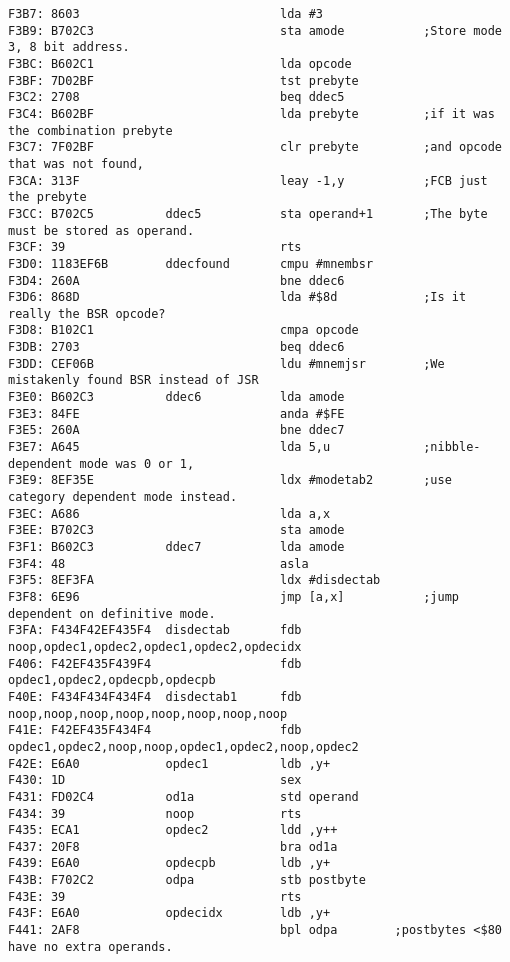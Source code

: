 {\begin{verbatim}
F3B7: 8603                            lda #3
F3B9: B702C3                          sta amode           ;Store mode 3, 8 bit address.
F3BC: B602C1                          lda opcode
F3BF: 7D02BF                          tst prebyte
F3C2: 2708                            beq ddec5
F3C4: B602BF                          lda prebyte         ;if it was the combination prebyte
F3C7: 7F02BF                          clr prebyte         ;and opcode that was not found,
F3CA: 313F                            leay -1,y           ;FCB just the prebyte
F3CC: B702C5          ddec5           sta operand+1       ;The byte must be stored as operand.        
F3CF: 39                              rts
F3D0: 1183EF6B        ddecfound       cmpu #mnembsr
F3D4: 260A                            bne ddec6
F3D6: 868D                            lda #$8d            ;Is it really the BSR opcode?
F3D8: B102C1                          cmpa opcode
F3DB: 2703                            beq ddec6
F3DD: CEF06B                          ldu #mnemjsr        ;We mistakenly found BSR instead of JSR
F3E0: B602C3          ddec6           lda amode
F3E3: 84FE                            anda #$FE
F3E5: 260A                            bne ddec7
F3E7: A645                            lda 5,u             ;nibble-dependent mode was 0 or 1,
F3E9: 8EF35E                          ldx #modetab2       ;use category dependent mode instead.
F3EC: A686                            lda a,x
F3EE: B702C3                          sta amode
F3F1: B602C3          ddec7           lda amode
F3F4: 48                              asla
F3F5: 8EF3FA                          ldx #disdectab
F3F8: 6E96                            jmp [a,x]           ;jump dependent on definitive mode.
F3FA: F434F42EF435F4  disdectab       fdb noop,opdec1,opdec2,opdec1,opdec2,opdecidx
F406: F42EF435F439F4                  fdb opdec1,opdec2,opdecpb,opdecpb
F40E: F434F434F434F4  disdectab1      fdb noop,noop,noop,noop,noop,noop,noop,noop
F41E: F42EF435F434F4                  fdb opdec1,opdec2,noop,noop,opdec1,opdec2,noop,opdec2
F42E: E6A0            opdec1          ldb ,y+
F430: 1D                              sex
F431: FD02C4          od1a            std operand
F434: 39              noop            rts 
F435: ECA1            opdec2          ldd ,y++
F437: 20F8                            bra od1a
F439: E6A0            opdecpb         ldb ,y+
F43B: F702C2          odpa            stb postbyte
F43E: 39                              rts
F43F: E6A0            opdecidx        ldb ,y+
F441: 2AF8                            bpl odpa        ;postbytes <$80 have no extra operands.

\end{verbatim}}
